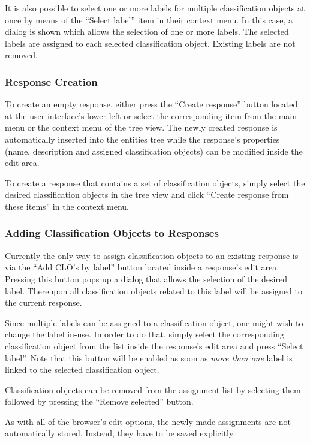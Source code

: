 It is also possible to select one or more labels for multiple classification
objects at once by means of the ``Select label'' item in their context menu. In
this case, a dialog is shown which allows the selection of one or more
labels. The selected labels are assigned to each selected classification
object. Existing labels are not removed.


\subsubsection{Response Creation}

To create an empty response, either press the ``Create response'' button located
at the user interface's lower left or select the corresponding item from the
main menu or the context menu of the tree view.  The newly created response is
automatically inserted into the entities tree while the response's properties
(name, description and assigned classification objects) can be modified inside
the edit area.

To create a response that contains a set of classification objects, simply
select the desired classification objects in the tree view and click ``Create
response from these items'' in the context menu.


\subsubsection{Adding Classification Objects to Responses}

Currently the only way to assign classification objects to an existing response
is via the ``Add CLO's by label'' button located inside a response's edit area.
Pressing this button pops up a dialog that allows the selection of the desired
label. Thereupon all classification objects related to this label will be
assigned to the current response.

Since multiple labels can be assigned to a classification object, one might wish
to change the label in-use. In order to do that, simply select the corresponding
classification object from the list inside the response's edit area and press
``Select label''. Note that this button will be enabled as soon as \emph{more
  than one} label is linked to the selected classification object.

Classification objects can be removed from the assignment list by selecting them
followed by pressing the ``Remove selected'' button.

As with all of the browser's edit options, the newly made assignments are not
automatically stored. Instead, they have to be saved explicitly.

